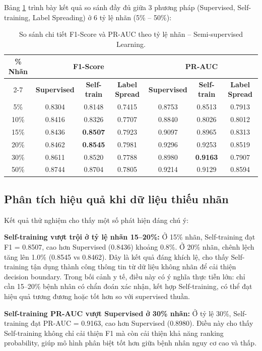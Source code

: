 Bảng \ref{tab:semi_results} trình bày kết quả so sánh đầy đủ giữa 3 phương pháp (Supervised, Self-training, Label Spreading) ở 6 tỷ lệ nhãn (5\% -- 50\%):

\begin{table}[H]
\centering
\caption{So sánh chi tiết F1-Score và PR-AUC theo tỷ lệ nhãn -- Semi-supervised Learning.}
\label{tab:semi_results}
\small
\begin{tabular}{|c|c|c|c|c|c|c|}
\hline
\multirow{2}{*}{\textbf{\% Nhãn}} & \multicolumn{3}{c|}{\textbf{F1-Score}} & \multicolumn{3}{c|}{\textbf{PR-AUC}} \\ \cline{2-7}
 & \textbf{Supervised} & \textbf{Self-train} & \textbf{Label Spread} & \textbf{Supervised} & \textbf{Self-train} & \textbf{Label Spread} \\ \hline
5\% & 0.8304 & 0.8148 & 0.7415 & 0.8753 & 0.8513 & 0.7913 \\ \hline
10\% & 0.8416 & 0.8326 & 0.7707 & 0.8840 & 0.8026 & 0.8012 \\ \hline
15\% & 0.8436 & \textbf{0.8507} & 0.7923 & 0.9097 & 0.8965 & 0.8313 \\ \hline
20\% & 0.8462 & \textbf{0.8545} & 0.7981 & 0.9296 & 0.9253 & 0.8519 \\ \hline
30\% & 0.8611 & 0.8520 & 0.7788 & 0.8980 & \textbf{0.9163} & 0.7907 \\ \hline
50\% & 0.8744 & 0.8704 & 0.7805 & 0.9214 & 0.9129 & 0.8594 \\ \hline
\end{tabular}
\end{table}

\subsection{Phân tích hiệu quả khi dữ liệu thiếu nhãn}

Kết quả thử nghiệm cho thấy một số phát hiện đáng chú ý:

\textbf{Self-training vượt trội ở tỷ lệ nhãn 15--20\%:} Ở 15\% nhãn, Self-training đạt F1 = 0.8507, cao hơn Supervised (0.8436) khoảng 0.8\%. Ở 20\% nhãn, chênh lệch tăng lên 1.0\% (0.8545 vs 0.8462). Đây là kết quả đáng khích lệ, cho thấy Self-training tận dụng thành công thông tin từ dữ liệu không nhãn để cải thiện decision boundary. Trong bối cảnh y tế, điều này có ý nghĩa thực tiễn lớn: chỉ cần 15--20\% bệnh nhân có chẩn đoán xác nhận, kết hợp Self-training, có thể đạt hiệu quả tương đương hoặc tốt hơn so với supervised thuần.

\textbf{Self-training PR-AUC vượt Supervised ở 30\% nhãn:} Ở tỷ lệ 30\%, Self-training đạt PR-AUC = 0.9163, cao hơn Supervised (0.8980). Điều này cho thấy Self-training không chỉ cải thiện F1 mà còn cải thiện khả năng ranking probability, giúp mô hình phân biệt tốt hơn giữa bệnh nhân nguy cơ cao và thấp.

